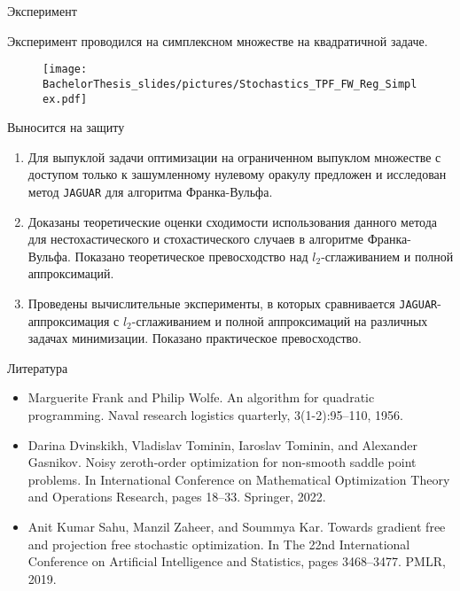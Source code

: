 \documentclass{beamer}
\begin{document}
\begin{frame}{Эксперимент}

    Эксперимент проводился на симплексном множестве на квадратичной задаче.

    \begin{figure}
        \centering
        \texttt{[image: BachelorThesis\_slides/pictures/Stochastics\_TPF\_FW\_Reg\_Simplex.pdf]}
    \end{figure}

\end{frame}


\begin{frame}{Выносится на защиту}

    \begin{enumerate}
        \item Для выпуклой задачи оптимизации на ограниченном выпуклом множестве с доступом только к зашумленному нулевому оракулу предложен и исследован метод \texttt{JAGUAR} для алгоритма Франка-Вульфа.
        \item Доказаны теоретические оценки сходимости использования данного метода для нестохастического и стохастического случаев в алгоритме Франка-Вульфа. Показано теоретическое превосходство над $l_2$-сглаживанием и полной аппроксимаций. 
        \item Проведены вычислительные эксперименты, в которых сравнивается \texttt{JAGUAR}-аппроксимация с $l_2$-сглаживанием и полной аппроксимаций на различных задачах минимизации. Показано практическое превосходство.
    \end{enumerate}

\end{frame}


\begin{frame}{Литература}
    \begin{itemize}
        \item Marguerite Frank and Philip Wolfe. An algorithm for quadratic programming. Naval research logistics quarterly, 3(1-2):95–110, 1956.
        \item Darina Dvinskikh, Vladislav Tominin, Iaroslav Tominin, and Alexander Gasnikov. Noisy zeroth-order optimization for non-smooth saddle point problems. In International Conference on Mathematical Optimization Theory and Operations Research, pages 18–33. Springer, 2022.
        \item Anit Kumar Sahu, Manzil Zaheer, and Soummya Kar. Towards gradient free and projection free stochastic optimization. In The 22nd International Conference on Artificial Intelligence and Statistics, pages 3468–3477. PMLR, 2019.
    \end{itemize}

\end{frame}

\end{document}
